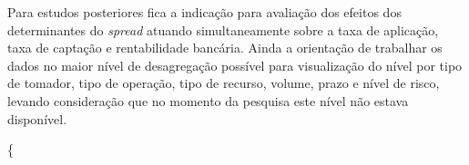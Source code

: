 \documentclass[
  12pt,
  12pt,
  openright,
  oneside,
  a4paper,
  chapter=TITLE,
  section=TITLE,
  subsection=TITLE,
  subsubsection=TITLE,
  portugues,
  sumario=tradicional]{abntex2}
\begin{document}
Para estudos posteriores fica a indicação para avaliação dos efeitos dos determinantes do \emph{spread} atuando simultaneamente sobre a taxa de aplicação, taxa de captação e rentabilidade bancária. Ainda a orientação de trabalhar os dados no maior nível de desagregação possível para visualização do nível por tipo de tomador, tipo de operação, tipo de recurso, volume, prazo e nível de risco, levando consideração que no momento da pesquisa este nível não estava disponível.

\postextual

\printbibliography[title={REFERÊNCIAS}]

\postextual



\{
\end{document}
